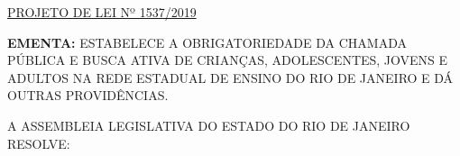 \documentclass[10pt]{article}
\date{}
\begin{document}
\maketitle
\begin{center}
  \huge
  \vspace{-3cm}\href{http://alerjln1.alerj.rj.gov.br/scpro1923.nsf/f4b46b3cdbba990083256cc900746cf6/1d293292b140e998832584a3005c1ac0?OpenDocument}{PROJETO DE LEI Nº 1537/2019}
\bigskip
\bigskip
\bigskip
  
\end{center}

\textbf{EMENTA:} 
ESTABELECE A OBRIGATORIEDADE DA CHAMADA PÚBLICA E BUSCA ATIVA DE CRIANÇAS, ADOLESCENTES, JOVENS E ADULTOS NA REDE ESTADUAL DE ENSINO DO RIO DE JANEIRO E DÁ OUTRAS PROVIDÊNCIAS.









\bigskip

\noindent
A ASSEMBLEIA LEGISLATIVA DO ESTADO DO RIO DE JANEIRO RESOLVE:
\end{document}
